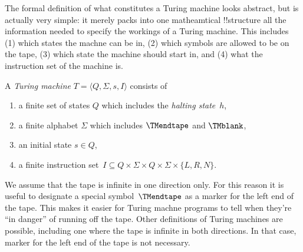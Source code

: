 \documentclass[../../include/open-logic-section]{subfiles}
\begin{document}

\begin{explain}
The formal definition of what constitutes a Turing machine looks
abstract, but is actually very simple: it merely packs into one
matheamtical !!{structure} all the information needed to specify the
workings of a Turing machine. This includes (1) which states the
machne can be in, (2) which symbols are allowed to be on the tape, (3)
which state the machine should start in, and (4) what the instruction
set of the machine is.
\end{explain}

\begin{defn}
A \emph{Turing machine} $T = \langle Q, \Sigma, s, I\rangle$ consists of
\begin{enumerate}
\item a finite set of states $Q$ which includes the \emph{halting state}~$h$,
\item a finite alphabet $\Sigma$ which includes $\TMendtape$ and
  $\TMblank$,
\item an initial state $s \in Q$,
\item a finite instruction set~$I \subseteq Q \times \Sigma \times Q
  \times \Sigma \times \{L, R, N\}$.
\end{enumerate}
\end{defn}

\begin{explain}
We assume that the tape is infinite in one direction only. For this
reason it is useful to designate a special symbol~$\TMendtape$ as
a marker for the left end of the tape.  This makes it easier for
Turing machne programs to tell when they're ``in danger'' of running
off the tape.  Other definitions of Turing machines are possible,
including one where the tape is infinite in both directions. In that
case, marker for the left end of the tape is not necessary.
\end{explain}
\end{document}
